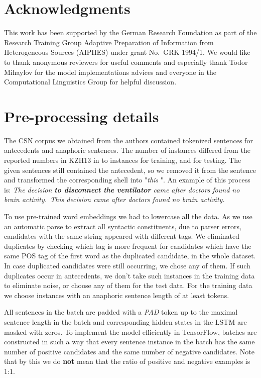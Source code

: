 \documentclass[11pt,letterpaper]{article}
\begin{document}
 	\section*{Acknowledgments}

This work has been supported by the German Research Foundation as part of the Research Training Group Adaptive Preparation of Information from Heterogeneous Sources (AIPHES) under grant No.\ GRK 1994/1.
We would like to thank anonymous reviewers for useful comments and especially thank Todor Mihaylov for the model implementations advices and everyone in the Computational Linguistics Group for helpful discussion. 
	
	
	\appendix
	\section{Pre-processing details}
The CSN corpus we obtained from the authors contained tokenized sentences for antecedents and anaphoric sentences. The number of instances differed from the reported numbers in KZH13 in  to  instances for training, and  for testing. The given 
sentences still contained the antecedent, so we removed it from the sentence and transformed the corresponding shell into "\textit{this} ". 
An example of this process is:
\textit{The decision \textbf{to disconnect the ventilator} came after doctors found no brain activity.}\  \textit{This decision came after doctors found no brain activity.}

To use pre-trained word embeddings we had to lowercase all the data. As we use an automatic parse to extract all syntactic constituents, due to parser errors, candidates with the same string appeared with different tags. We eliminated duplicates by checking which tag is more frequent for candidates which have the same POS tag of the first word as the duplicated candidate, in the whole dataset. In case duplicated candidates were still occurring, we chose any of them. If such duplicates occur in antecedents, we don't take such instances in the training data to eliminate noise, or choose any of them for the test data. For the training data we choose instances with an anaphoric sentence length of at least  tokens. 

All sentences in the batch are padded with a \textit{PAD} token up to the maximal sentence length in the batch and corresponding hidden states in the LSTM are masked with zeros. To implement the model efficiently in TensorFlow, batches are constructed in such a way that every sentence instance in the batch has the same number of positive candidates and the same number of negative candidates. Note that by this we do \textbf{not} mean that the ratio of positive and negative examples is 1:1.
\end{document}
